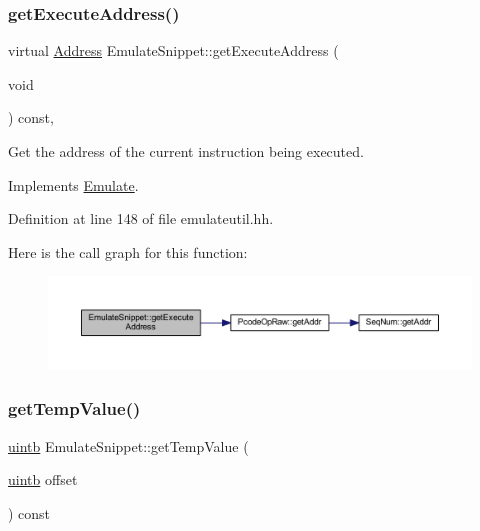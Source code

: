 \subsubsection{\texorpdfstring{getExecuteAddress()}{getExecuteAddress()}}
{\footnotesize\ttfamily virtual \mbox{\hyperlink{class_address}{Address}} Emulate\+Snippet\+::get\+Execute\+Address (\begin{DoxyParamCaption}\item[{void}]{ }\end{DoxyParamCaption}) const\hspace{0.3cm}{\ttfamily [inline]}, {\ttfamily [virtual]}}



Get the address of the current instruction being executed. 



Implements \mbox{\hyperlink{class_emulate_aeca3c773876b391304afffe2a5eff9de}{Emulate}}.



Definition at line 148 of file emulateutil.\+hh.

Here is the call graph for this function\+:
\nopagebreak
\begin{figure}[H]
\begin{center}
\leavevmode
\includegraphics[width=350pt]{class_emulate_snippet_aef11e510794c009453333e847acc38e9_cgraph}
\end{center}
\end{figure}
\mbox{\label{class_emulate_snippet_a77a5c0e4b9085b84e2d487568f9aa484}} 
\subsubsection{\texorpdfstring{getTempValue()}{getTempValue()}}
{\footnotesize\ttfamily \mbox{\hyperlink{types_8h_a2db313c5d32a12b01d26ac9b3bca178f}{uintb}} Emulate\+Snippet\+::get\+Temp\+Value (\begin{DoxyParamCaption}\item[{\mbox{\hyperlink{types_8h_a2db313c5d32a12b01d26ac9b3bca178f}{uintb}}}]{offset }\end{DoxyParamCaption}) const}




